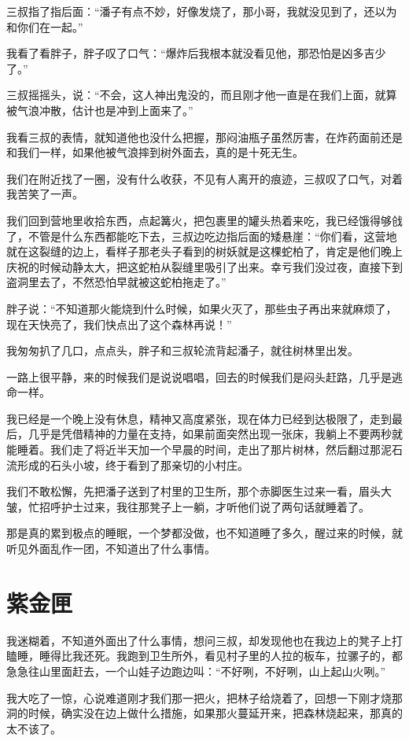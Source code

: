 三叔指了指后面：“潘子有点不妙，好像发烧了，那小哥，我就没见到了，还以为和你们在一起。”

我看了看胖子，胖子叹了口气：“爆炸后我根本就没看见他，那恐怕是凶多吉少了。”

三叔摇摇头，说：“不会，这人神出鬼没的，而且刚才他一直是在我们上面，就算被气浪冲散，估计也是冲到上面来了。”

我看三叔的表情，就知道他也没什么把握，那闷油瓶子虽然厉害，在炸药面前还是和我们一样，如果他被气浪摔到树外面去，真的是十死无生。

我们在附近找了一圈，没有什么收获，不见有人离开的痕迹，三叔叹了口气，对着我苦笑了一声。

我们回到营地里收拾东西，点起篝火，把包裹里的罐头热着来吃，我已经饿得够戗了，不管是什么东西都能吃下去，三叔边吃边指后面的矮悬崖：“你们看，这营地就在这裂缝的边上，看样子那老头子看到的树妖就是这棵蛇柏了，肯定是他们晚上庆祝的时候动静太大，把这蛇柏从裂缝里吸引了出来。幸亏我们没过夜，直接下到盗洞里去了，不然恐怕早就被这蛇柏拖走了。”

胖子说：“不知道那火能烧到什么时候，如果火灭了，那些虫子再出来就麻烦了，现在天快亮了，我们快点出了这个森林再说！”

我匆匆扒了几口，点点头，胖子和三叔轮流背起潘子，就往树林里出发。

一路上很平静，来的时候我们是说说唱唱，回去的时候我们是闷头赶路，几乎是逃命一样。

我已经是一个晚上没有休息，精神又高度紧张，现在体力已经到达极限了，走到最后，几乎是凭借精神的力量在支持，如果前面突然出现一张床，我躺上不要两秒就能睡着。我们走了将近半天加一个早晨的时间，走出了那片树林，然后翻过那泥石流形成的石头小坡，终于看到了那亲切的小村庄。

我们不敢松懈，先把潘子送到了村里的卫生所，那个赤脚医生过来一看，眉头大皱，忙招呼护士过来，我往那凳子上一躺，才听他们说了两句话就睡着了。

那是真的累到极点的睡眠，一个梦都没做，也不知道睡了多久，醒过来的时候，就听见外面乱作一团，不知道出了什么事情。

\chapter{紫金匣}

我迷糊着，不知道外面出了什么事情，想问三叔，却发现他也在我边上的凳子上打瞌睡，睡得比我还死。我跑到卫生所外，看见村子里的人拉的板车，拉骡子的，都急急往山里面赶去，一个山娃子边跑边叫：“不好咧，不好咧，山上起山火咧。”

我大吃了一惊，心说难道刚才我们那一把火，把林子给烧着了，回想一下刚才烧那洞的时候，确实没在边上做什么措施，如果那火蔓延开来，把森林烧起来，那真的太不该了。


